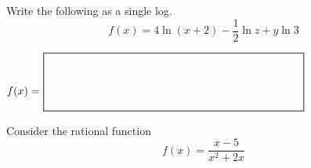 \documentclass[addpoints,12pt]{exam}
\newcommand*{\Scale}[2][4]{\scalebox{#1}{\ensuremath{#2}}}%
\begin{document}
\begin{questions}
\question[4]
Write the following as a single log.
\[
f(x)=4\ln(x+2)-\frac{1}{2}\ln z+y\ln 3
\]
\vfill
\begin{center}
            $
                \mbox{$f(x)=$ } \Scale[1.5]{\boxed{ \phantom{\dfrac{\dfrac{a}{b}}{b}} \hspace{5cm} }}
            $
            \end{center}
\newpage





\question Consider the rational function
\[
f(x)=\dfrac{x-5}{x^2+2x}
\]
\end{questions}
\end{document}
